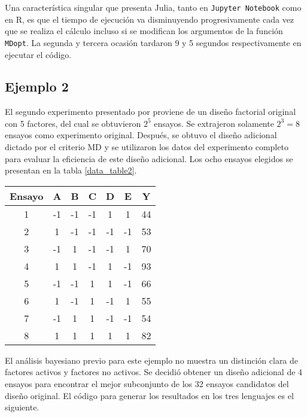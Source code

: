 Una característica singular que presenta \textsf{Julia}, tanto en \texttt{Jupyter Notebook} como en \textsf{R}, es que el tiempo de ejecución va disminuyendo progresivamente cada vez que se realiza el cálculo incluso si se modifican los argumentos de la función \texttt{MDopt}. La segunda y tercera ocasión tardaron 9 y 5 segundos respectivamente en ejecutar el código. 


\subsection{Ejemplo 2}
El segundo experimento presentado por \cite{meyer1996} proviene de un diseño factorial original con 5 factores, del cual se obtuvieron $2^{5}$ ensayos. Se extrajeron solamente $2^{3} = 8$ ensayos como experimento original. Después, se obtuvo el diseño adicional dictado por el criterio MD y se utilizaron los datos del experimento completo para evaluar la eficiencia de este diseño adicional. Los ocho ensayos elegidos se presentan en la tabla \ref{data_table2}. 

\begin{center}
	\begin{tabular}{cccccc|c}
		Ensayo & A & B & C & D & E & Y \\
		\hline
		1 & -1 & -1 & -1 & 1 & 1 & 44 \\
		
		2 & 1 & -1 & -1 & -1 & -1 & 53 \\
		
		3 & -1 & 1 & -1 & -1 & 1 & 70 \\
		
		4 & 1 & 1 & -1 & 1 & -1 & 93 \\
		
		5 & -1 & -1 & 1 & 1 & -1 & 66 \\

		6 & 1 & -1 & 1 & -1 & 1 & 55 \\
		
		7 & -1 & 1 & 1 & -1 & -1 & 54 \\
		
		8 & 1 & 1 & 1 & 1 & 1 & 82 \\	
		
	\end{tabular}
	 \label{data_table2}
\end{center}

El análisis bayesiano previo para este ejemplo no muestra un distinción clara de factores activos y factores no activos. Se decidió obtener un diseño adicional de 4 ensayos para encontrar el mejor subconjunto de los 32 ensayos candidatos del diseño original. El código para generar los resultados en los tres lenguajes es el siguiente.

